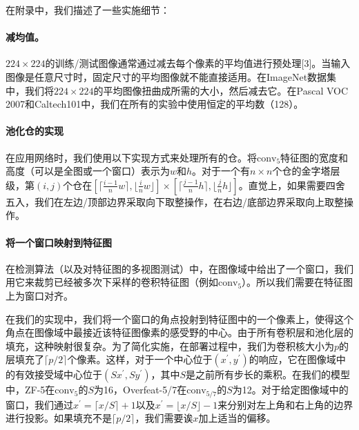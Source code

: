 \documentclass[../main.tex]{subfile}
\begin{document}
在附录中，我们描述了一些实施细节：

\paragraph{减均值。}

$224×224$的训练/测试图像通常通过减去每个像素的平均值进行预处理[3]。当输入图像是任意尺寸时，固定尺寸的平均图像就不能直接适用。在ImageNet数据集中，我们将$224×224$的平均图像扭曲成所需的大小，然后减去它。在Pascal VOC 2007和Caltech101中，我们在所有的实验中使用恒定的平均数（128）。

\paragraph{池化仓的实现}

在应用网络时，我们使用以下实现方式来处理所有的仓。将$\text{conv}_5$特征图的宽度和高度（可以是全图或一个窗口）表示为$w$和$h$。对于一个有$n \times n$个仓的金字塔层级，第$\left( i, j \right)$个仓在$\left[ \lceil \frac{i-1}{n}w \rceil, \lfloor \frac{i}{n}w \rfloor \right] \times \left[ \lceil \frac{j-1}{n}h \rceil, \lfloor \frac{j}{n}h \rfloor \right]$。直觉上，如果需要四舍五入，我们在左边/顶部边界采取向下取整操作，在右边/底部边界采取向上取整操作。

\paragraph{将一个窗口映射到特征图}

在检测算法（以及对特征图的多视图测试）中，在图像域中给出了一个窗口，我们用它来裁剪已经被多次下采样的卷积特征图（例如$\text{conv}_5$）。所以我们需要在特征图上为窗口对齐。

在我们的实现中，我们将一个窗口的角点投射到特征图中的一个像素上，使得这个角点在图像域中最接近该特征图像素的感受野的中心。由于所有卷积层和池化层的填充，这种映射很复杂。为了简化实施，在部署过程中，我们为卷积核大小为$p$的层填充了$\lceil p/2 \rceil$个像素。这样，对于一个中心位于$\left( x^\prime, y^\prime \right)$的响应，它在图像域中的有效接受域中心位于$\left( Sx^\prime, Sy^\prime \right)$，其中$S$是之前所有步长的乘积。在我们的模型中，ZF-5在$\text{conv}_5$的$S$为16，Overfeat-5/7在$\text{conv}_{5/7}$的$S$为12。对于给定图像域中的窗口，我们通过$x^\prime = \lceil x / S \rceil + 1$以及$x^\prime = \lfloor x / S \rfloor - 1$来分别对左上角和右上角的边界进行投影。如果填充不是$\lceil p/2 \rceil$，我们需要诶$x$加上适当的偏移。
\end{document}
